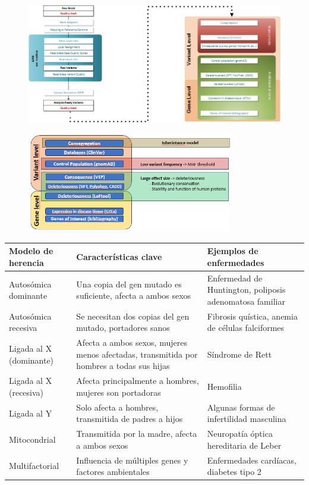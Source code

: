 \begin{figure}[htbp]
\centering
\includegraphics[width = \textwidth]{figs/Imagen5.jpg}
\end{figure}

\begin{figure}[htbp]
\centering
\includegraphics[width = 0.8\textwidth]{figs/filtering_approaches.png}
\end{figure}

\begin{table}[htbp]
\centering
\begin{tabular}{p{3cm}|p{8cm}|p{4cm}}
Modelo de herencia & Características clave & Ejemplos de enfermedades \\ \hline
Autosómica dominante & Una copia del gen mutado es suficiente, afecta a ambos sexos & Enfermedad de Huntington, poliposis adenomatosa familiar \\
Autosómica recesiva & Se necesitan dos copias del gen mutado, portadores sanos & Fibrosis quística, anemia de células falciformes \\
Ligada al X (dominante) & Afecta a ambos sexos, mujeres menos afectadas, transmitida por hombres a todas sus hijas & Síndrome de Rett \\
Ligada al X (recesiva) & Afecta principalmente a hombres, mujeres son portadoras & Hemofilia \\
Ligada al Y & Solo afecta a hombres, transmitida de padres a hijos & Algunas formas de infertilidad masculina \\
Mitocondrial & Transmitida por la madre, afecta a ambos sexos & Neuropatía óptica hereditaria de Leber \\
Multifactorial & Influencia de múltiples genes y factores ambientales & Enfermedades cardíacas, diabetes tipo 2
\end{tabular}
\end{table}

